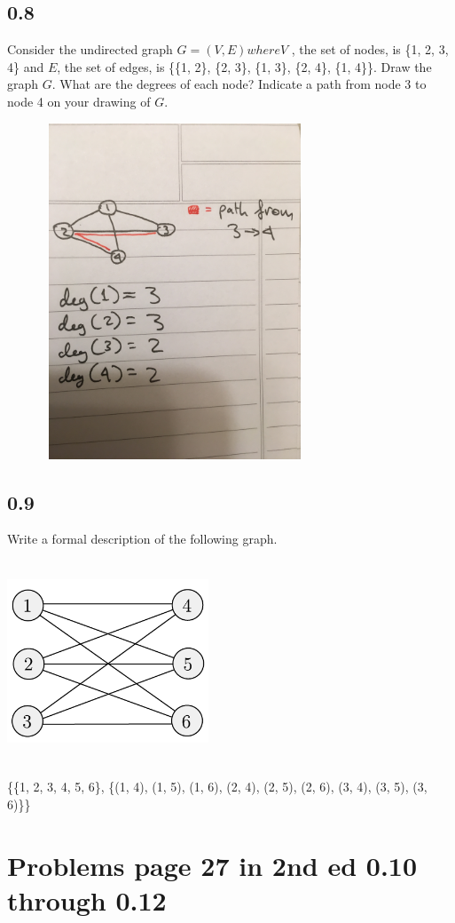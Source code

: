\documentclass[11pt]{article}
\begin{document}
\subsection*{0.8}
Consider the undirected graph $G=(V,E) where V$ , the set of nodes, is \{1, 2, 3, 4\} and $E$, the set of edges, is \{\{1, 2\}, \{2, 3\}, \{1, 3\}, \{2, 4\}, \{1, 4\}\}. Draw the graph $G$. What are the degrees of each node? Indicate a path from node 3 to
node 4 on your drawing of $G$.\\
\begin{center} \includegraphics[width=10cm,height=10cm,keepaspectratio]{exer08} \end{center}

\pagebreak
\subsection*{0.9}
Write a formal description of the following graph.
\begin{center} \includegraphics[width=6cm,height=6cm,keepaspectratio]{exer09} \end{center}
\{\{1, 2, 3, 4, 5, 6\}, \{(1, 4), (1, 5), (1, 6), (2, 4), (2, 5), (2, 6), (3, 4), (3, 5), (3, 6)\}\}

\section{Problems page 27 in 2nd ed 0.10 through 0.12}
\end{document}
